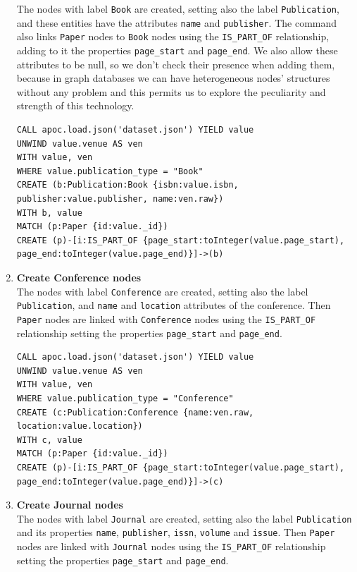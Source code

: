 \begin{enumerate}
    The nodes with label \verb|Book| are created, setting also the label \verb|Publication|, and these entities have the attributes \verb|name| and \verb|publisher|.
    The command also links \verb|Paper| nodes to \verb|Book| nodes using the \verb|IS_PART_OF| relationship, adding to it the properties \verb|page_start| and \verb|page_end|.
    We also allow these attributes to be null, so we don't check their presence when adding them, because in graph databases we can have heterogeneous nodes' structures without any problem and this permits us to explore the peculiarity and strength of this technology.
    \begin{lstlisting}[label={lst:book}]
CALL apoc.load.json('dataset.json') YIELD value
UNWIND value.venue AS ven
WITH value, ven
WHERE value.publication_type = "Book"
CREATE (b:Publication:Book {isbn:value.isbn, publisher:value.publisher, name:ven.raw})
WITH b, value
MATCH (p:Paper {id:value._id})
CREATE (p)-[i:IS_PART_OF {page_start:toInteger(value.page_start), page_end:toInteger(value.page_end)}]->(b)
    \end{lstlisting}
    \item \textbf{Create Conference nodes} \\
    The nodes with label \verb|Conference| are created, setting also the label \verb|Publication|, and \verb|name| and \verb|location| attributes of the conference.
    Then \verb|Paper| nodes are linked with \verb|Conference| nodes using the \verb|IS_PART_OF| relationship setting the properties \verb|page_start| and \verb|page_end|.
    \begin{lstlisting}[label={lst:conference}]
CALL apoc.load.json('dataset.json') YIELD value
UNWIND value.venue AS ven
WITH value, ven
WHERE value.publication_type = "Conference"
CREATE (c:Publication:Conference {name:ven.raw, location:value.location})
WITH c, value
MATCH (p:Paper {id:value._id})
CREATE (p)-[i:IS_PART_OF {page_start:toInteger(value.page_start), page_end:toInteger(value.page_end)}]->(c)
    \end{lstlisting}
    \item \textbf{Create Journal nodes} \\
    The nodes with label \verb|Journal| are created, setting also the label \verb|Publication| and its properties \verb|name|, \verb|publisher|, \verb|issn|, \verb|volume| and \verb|issue|.
    Then \verb|Paper| nodes are linked with \verb|Journal| nodes using the \verb|IS_PART_OF| relationship setting the properties \verb|page_start| and \verb|page_end|.
    \begin{lstlisting}[label={lst:journal}]

\end{lstlisting}
\end{enumerate}
